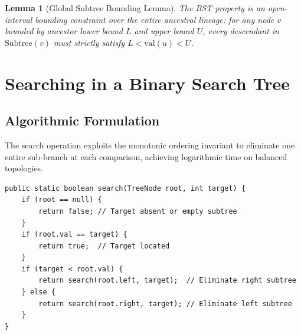 \documentclass[10pt,journal,compsoc,onecolumn]{IEEEtran}
\newtheorem{lemma}[theorem]{Lemma}
\begin{document}
\begin{lemma}[Global Subtree Bounding Lemma]
The BST property is an open-interval bounding constraint over the entire ancestral lineage: for any node $v$ bounded by ancestor lower bound $L$ and upper bound $U$, every descendant in $\mathrm{Subtree}(v)$ must strictly satisfy $L < \mathrm{val}(u) < U$.
\end{lemma}

\section{Searching in a Binary Search Tree}
\label{sec:search}

\subsection{Algorithmic Formulation}

The search operation exploits the monotonic ordering invariant to eliminate one entire sub-branch at each comparison, achieving logarithmic time on balanced topologies.

\begin{verbatim}
public static boolean search(TreeNode root, int target) {
    if (root == null) {
        return false; // Target absent or empty subtree
    }
    if (root.val == target) {
        return true;  // Target located
    }
    if (target < root.val) {
        return search(root.left, target);  // Eliminate right subtree
    } else {
        return search(root.right, target); // Eliminate left subtree
    }
}
\end{verbatim}
\end{document}
